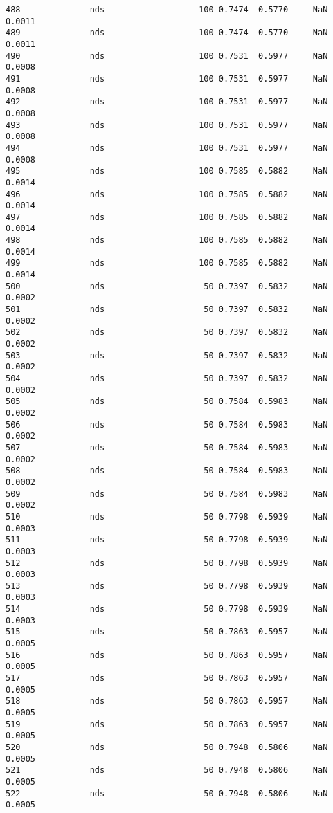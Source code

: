 \documentclass[11pt]{article}
\begin{document}
\begin{Verbatim}[commandchars=\\\{\}]
488              nds                   100 0.7474  0.5770     NaN 0.0011   
489              nds                   100 0.7474  0.5770     NaN 0.0011   
490              nds                   100 0.7531  0.5977     NaN 0.0008   
491              nds                   100 0.7531  0.5977     NaN 0.0008   
492              nds                   100 0.7531  0.5977     NaN 0.0008   
493              nds                   100 0.7531  0.5977     NaN 0.0008   
494              nds                   100 0.7531  0.5977     NaN 0.0008   
495              nds                   100 0.7585  0.5882     NaN 0.0014   
496              nds                   100 0.7585  0.5882     NaN 0.0014   
497              nds                   100 0.7585  0.5882     NaN 0.0014   
498              nds                   100 0.7585  0.5882     NaN 0.0014   
499              nds                   100 0.7585  0.5882     NaN 0.0014   
500              nds                    50 0.7397  0.5832     NaN 0.0002   
501              nds                    50 0.7397  0.5832     NaN 0.0002   
502              nds                    50 0.7397  0.5832     NaN 0.0002   
503              nds                    50 0.7397  0.5832     NaN 0.0002   
504              nds                    50 0.7397  0.5832     NaN 0.0002   
505              nds                    50 0.7584  0.5983     NaN 0.0002   
506              nds                    50 0.7584  0.5983     NaN 0.0002   
507              nds                    50 0.7584  0.5983     NaN 0.0002   
508              nds                    50 0.7584  0.5983     NaN 0.0002   
509              nds                    50 0.7584  0.5983     NaN 0.0002   
510              nds                    50 0.7798  0.5939     NaN 0.0003   
511              nds                    50 0.7798  0.5939     NaN 0.0003   
512              nds                    50 0.7798  0.5939     NaN 0.0003   
513              nds                    50 0.7798  0.5939     NaN 0.0003   
514              nds                    50 0.7798  0.5939     NaN 0.0003   
515              nds                    50 0.7863  0.5957     NaN 0.0005   
516              nds                    50 0.7863  0.5957     NaN 0.0005   
517              nds                    50 0.7863  0.5957     NaN 0.0005   
518              nds                    50 0.7863  0.5957     NaN 0.0005   
519              nds                    50 0.7863  0.5957     NaN 0.0005   
520              nds                    50 0.7948  0.5806     NaN 0.0005   
521              nds                    50 0.7948  0.5806     NaN 0.0005   
522              nds                    50 0.7948  0.5806     NaN 0.0005   

\end{Verbatim}
\end{document}
